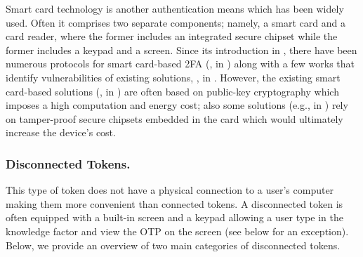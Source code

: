 Smart card technology is another authentication means which has been widely used. Often it comprises two separate components; namely, a smart card and a card reader, where the former includes an integrated secure chipset while the former includes a keypad and a screen. Since its introduction in \cite{chang1991remote}, there have been numerous protocols for smart card-based 2FA (\eg, in \cite{gupta2021machine,WangW18,radhakrishnan2022dependable}) along with a few works that identify vulnerabilities of existing solutions, \eg, in \cite{TianLHL20,WangGCW16,ChaturvediDMM16}. However, the existing smart card-based solutions (\eg, in \cite{gupta2021machine,WangW18,radhakrishnan2022dependable}) are often based on public-key cryptography which imposes a high computation and energy cost; also some solutions (e.g., in \cite{kim2009more}) rely on tamper-proof secure chipsets embedded in the card which would ultimately increase the device's cost. 







\subsubsection{Disconnected Tokens.}

This type of token does not have a physical connection to a user's computer making them more convenient than connected tokens. A disconnected token is often equipped with a built-in screen and a keypad allowing a user type in the knowledge factor and view the OTP on the screen (see below for an exception).  Below, we provide an overview of two main categories of disconnected tokens.

